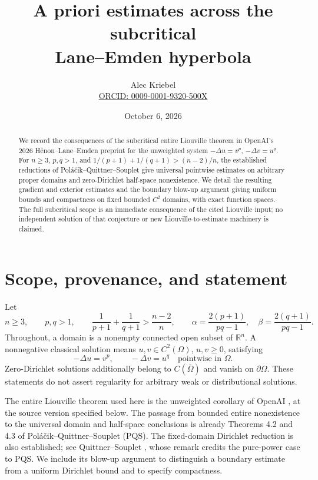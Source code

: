 \documentclass[11pt]{article}
\title{A priori estimates across the subcritical\texorpdfstring{\\}{ }Lane--Emden hyperbola}
\author{Alec Kriebel\\\small\href{https://orcid.org/0009-0001-9320-500X}{ORCID: 0009-0001-9320-500X}}
\date{October 6, 2026}
\newcommand{\R}{\mathbb R}
\begin{document}
\maketitle
\begin{abstract}
We record the consequences of the subcritical entire Liouville theorem in
OpenAI's 2026 H\'enon--Lane--Emden preprint for the unweighted system
$-\Delta u=v^p$, $-\Delta v=u^q$. For $n\ge3$, $p,q>1$, and
$1/(p+1)+1/(q+1)>(n-2)/n$, the established reductions of
Pol\'a\v{c}ik--Quittner--Souplet give universal pointwise estimates on
arbitrary proper domains and zero-Dirichlet half-space nonexistence.
We detail the resulting gradient and exterior estimates and the
boundary blow-up argument giving uniform bounds and compactness on
fixed bounded $C^2$ domains, with exact function spaces.
The full subcritical scope is an immediate consequence of the cited
Liouville input; no independent solution of that conjecture or new
Liouville-to-estimate machinery is claimed.
\end{abstract}

\section{Scope, provenance, and statement}
Let
\begin{equation}\label{range}
 n\ge3,\qquad p,q>1,\qquad
 \frac1{p+1}+\frac1{q+1}>\frac{n-2}{n},
 \qquad
 \alpha=\frac{2(p+1)}{pq-1},\quad
 \beta=\frac{2(q+1)}{pq-1}.
\end{equation}
Throughout, a domain is a nonempty connected open subset of $\R^n$.
A nonnegative classical solution means $u,v\in C^2(\Omega)$,
$u,v\ge0$, satisfying
\begin{equation}\label{system}
 -\Delta u=v^p,\qquad -\Delta v=u^q
 \quad\text{pointwise in }\Omega.
\end{equation}
Zero-Dirichlet solutions additionally belong to $C(\overline\Omega)$
and vanish on $\partial\Omega$. These statements do not assert
regularity for arbitrary weak or distributional solutions.

The entire Liouville theorem used here is the unweighted corollary of
OpenAI \cite{OAI}, at the source version specified below.
The passage from bounded entire nonexistence to the universal domain
and half-space conclusions is already Theorems 4.2 and 4.3 of
Pol\'a\v{c}ik--Quittner--Souplet \cite{PQS} (PQS).
The fixed-domain Dirichlet reduction is also established; see
Quittner--Souplet \cite[Theorem 4.1(ii) and Remark 4.1(ii)]{QS},
whose remark credits the pure-power case to PQS.
We include its blow-up argument to distinguish a boundary estimate
from a uniform Dirichlet bound and to specify compactness.
\end{document}
